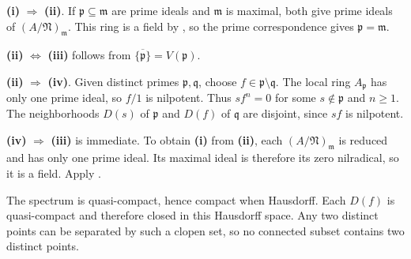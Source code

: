\textbf{(i)} $\Rightarrow$ \textbf{(ii)}. If $\mathfrak p\subseteq\mathfrak m$ are prime ideals and $\mathfrak m$ is maximal, both give prime ideals of $(A/\mathfrak N)_{\mathfrak m}$. This ring is a field by , so the prime correspondence gives $\mathfrak p=\mathfrak m$.

\textbf{(ii)} $\Leftrightarrow$ \textbf{(iii)} follows from $\overline{\{\mathfrak p\}}=V(\mathfrak p)$.

\textbf{(ii)} $\Rightarrow$ \textbf{(iv)}. Given distinct primes $\mathfrak p,\mathfrak q$, choose $f\in\mathfrak p\setminus\mathfrak q$. The local ring $A_{\mathfrak p}$ has only one prime ideal, so $f/1$ is nilpotent. Thus $sf^n=0$ for some $s\notin\mathfrak p$ and $n\ge1$. The neighborhoods $D(s)$ of $\mathfrak p$ and $D(f)$ of $\mathfrak q$ are disjoint, since $sf$ is nilpotent.

\textbf{(iv)} $\Rightarrow$ \textbf{(iii)} is immediate. To obtain \textbf{(i)} from \textbf{(ii)}, each $(A/\mathfrak N)_{\mathfrak m}$ is reduced and has only one prime ideal. Its maximal ideal is therefore its zero nilradical, so it is a field. Apply .

The spectrum is quasi-compact, hence compact when Hausdorff. Each $D(f)$ is quasi-compact and therefore closed in this Hausdorff space. Any two distinct points can be separated by such a clopen set, so no connected subset contains two distinct points.
